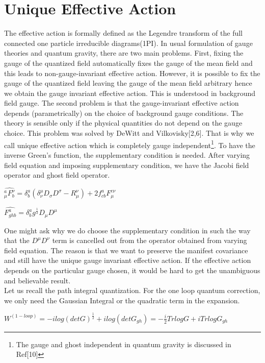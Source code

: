 \documentclass[a4paper,12 pt]{article}
\begin{document}
\section{Unique Effective Action}
The effective action is formally defined as the Legendre transform
of the full connected one particle irreducible diagrams(1PI). In
usual formulation of gauge theories and quantum gravity, there are
two main problems. First, fixing the gauge of the quantized field
automatically fixes the gauge of the mean field and this leads to
non-gauge-invariant effective action. However, it is possible to
fix the gauge of the quantized field leaving the gauge of the mean
field arbitrary hence we obtain the gauge invariant effective
action. This is understood in background field gauge. The second
problem is that the gauge-invariant effective action depends
(parametrically) on the choice of background gauge conditions. The
theory is sensible only if the physical quantities do not depend
on the gauge choice. This problem was solved by DeWitt and
Vilkovisky[2,6]. That is why we call unique effective action which
is completely gauge independent\footnote{The gauge and ghost
independent in quantum gravity is discussed in Ref[10]}. To have
the inverse Green's function, the supplementary condition is
needed. After varying field equation and imposing supplementary
condition, we have the Jacobi field operator and ghost field
operator.
\begin{center}
$ \hat{^{a}_{\mu}F_{b}^{\nu}} =
\delta^{a}_{b}(\delta^{\mu}_{\nu}D_{\sigma}D^{\sigma}-R_{\mu}^{\nu})+
2f^{a}_{c b}F^{c \nu}_{\mu}$
\end{center}
\begin{center}
 $ \hat{F_{gh b}^{a}} =
\delta^{a}_{b}g^{\frac{1}{2}}D_{\mu}D^{\mu}$
\end{center}
One might ask why we do choose the supplementary condition in such
the way that the $ D^{\mu}D^{\nu} $ term is cancelled out from
the operator obtained from varying field equation. The reason is
that we want to preserve the manifest covariance and still have
the unique gauge invariant effective action. If the effective
action depends on the particular gauge chosen, it would be hard to
get the unambiguous and believable result.
\\
Let us recall the path integral quantization. For the one loop
quantum correction, we only need the
 Gaussian Integral or the quadratic term in the expansion.
\begin{center}
   $ W^{(1-loop)} = -i log (detG)^{\frac{1}{2}} + i log (detG_{gh}) = -\frac{i}{2} Trlog G + i Trlog G_{gh} $
 \end{center}
\end{document}
